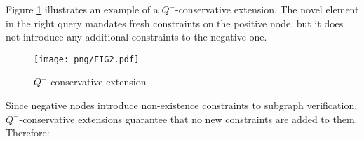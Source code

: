 \documentclass{article}%
\begin{document}
Figure \ref{ejemplo-conservativa} illustrates an example of a $Q^-$-conservative extension. The novel element in the right query mandates fresh constraints on the positive node, but it does not introduce any additional constraints to the negative one.

\begin{figure}[h]
    \begin{center}
        \texttt{[image: png/FIG2.pdf]}
    \end{center}
    \caption{%
        $Q^-$-conservative extension
    }%
    \label{ejemplo-conservativa}
\end{figure}

Since negative nodes introduce non-existence constraints to subgraph verification, $Q^-$-conservative extensions guarantee that no new constraints are added to them. Therefore:
\end{document}
